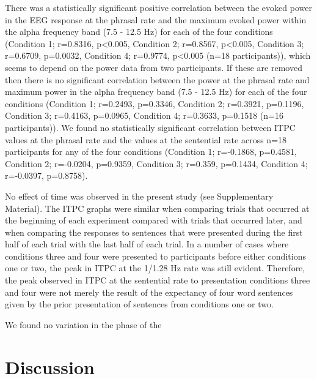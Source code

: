 \documentclass[10pt,letterpaper]{article}
\begin{document}

There was a statistically significant positive correlation between the
evoked power in the EEG response at the phrasal rate and the maximum
evoked power within the alpha frequency band (7.5 - 12.5 Hz) for each
of the four conditions (Condition 1; r=0.8316, p<0.005, Condition 2;
r=0.8567, p<0.005, Condition 3; r=0.6709, p=0.0032, Condition 4;
r=0.9774, p<0.005 (n=18 participants)), which seems to depend on the
power data from two participants. If these are removed then there is
no significant correlation between the power at the phrasal rate and
maximum power in the alpha frequency band (7.5 - 12.5 Hz) for each of
the four conditions (Condition 1; r=0.2493, p=0.3346, Condition 2;
r=0.3921, p=0.1196, Condition 3; r=0.4163, p=0.0965, Condition 4;
r=0.3633, p=0.1518 (n=16 participants)). We found no statistically
significant correlation between ITPC values at the phrasal rate and
the values at the sentential rate across n=18 participants for any of
the four conditions (Condition 1; r=-0.1868, p=0.4581, Condition 2;
r=-0.0204, p=0.9359, Condition 3; r=0.359, p=0.1434, Condition 4;
r=-0.0397, p=0.8758).
 
No effect of time was observed in the present study (see Supplementary Material). The ITPC graphs were similar when comparing trials that occurred at the beginning of each experiment compared with trials that occurred later, and when comparing the responses to sentences that were presented during the first half of each trial with the last half of each trial. In a number of cases where conditions three and four were presented to participants before either conditions one or two, the peak in ITPC at the 1/1.28 Hz rate was still evident. Therefore, the peak observed in ITPC at the sentential rate to presentation conditions three and four were not merely the result of the expectancy of four word sentences given by the prior presentation of sentences from conditions one or two.

We found no variation in the phase of the


\section*{Discussion}

\end{document}
